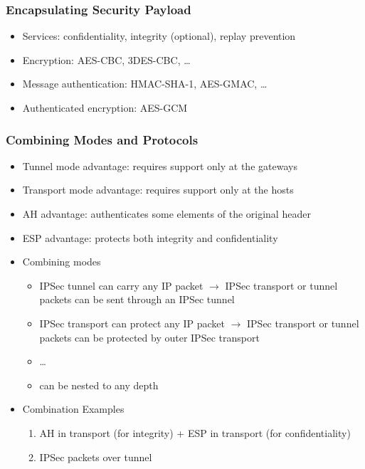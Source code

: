 \documentclass[final]{article}
\begin{document}
\subsubsection*{Encapsulating Security Payload}
\begin{itemize}[nosep]
    \item Services: confidentiality, integrity (optional), replay prevention
    \item Encryption: AES-CBC, 3DES-CBC, \dots
    \item Message authentication: HMAC-SHA-1, AES-GMAC, \dots
    \item Authenticated encryption: AES-GCM
\end{itemize}
\subsubsection*{Combining Modes and Protocols}
\begin{itemize}[nosep]
    \item Tunnel mode advantage: requires support only at the gateways
    \item Transport mode advantage: requires support only at the hosts
    \item AH advantage: authenticates some elements of the original header
    \item ESP advantage: protects both integrity and confidentiality
    \item Combining modes
          \begin{itemize}[nosep]
              \item IPSec tunnel can carry any IP packet $\rightarrow$ IPSec transport or tunnel packets can be sent through an IPSec tunnel
              \item IPSec transport can protect any IP packet $\rightarrow$ IPSec transport or tunnel packets can be protected by outer IPSec transport
              \item \dots
              \item can be nested to any depth
          \end{itemize}
    \item Combination Examples
          \begin{enumerate}[nosep]
              \item AH in transport (for integrity) + ESP in transport (for confidentiality)
              \item IPSec packets over tunnel
          \end{enumerate}
\end{itemize}
\end{document}
